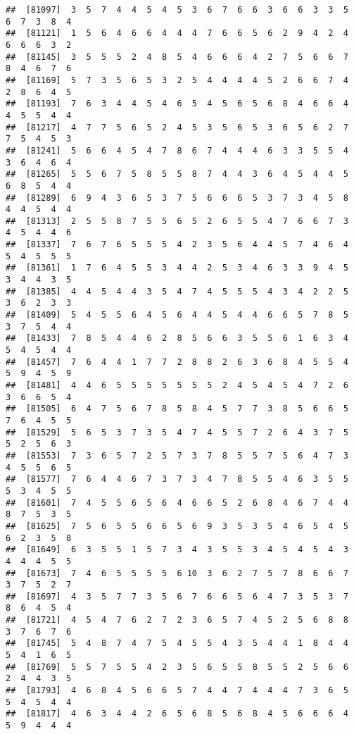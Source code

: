 \documentclass[
]{book}
\begin{document}
\begin{verbatim}
##  [81097]  3  5  7  4  4  5  4  5  3  6  7  6  6  3  6  6  3  3  5  6  7  3  8  4
##  [81121]  1  5  6  4  6  6  4  4  4  7  6  6  5  6  2  9  4  2  4  6  6  6  3  2
##  [81145]  3  5  5  5  2  4  8  5  4  6  6  6  4  2  7  5  6  6  7  8  4  6  7  6
##  [81169]  5  7  3  5  6  5  3  2  5  4  4  4  4  5  2  6  6  7  4  2  8  6  4  5
##  [81193]  7  6  3  4  4  5  4  6  5  4  5  6  5  6  8  4  6  6  4  4  5  5  4  4
##  [81217]  4  7  7  5  6  5  2  4  5  3  5  6  5  3  6  5  6  2  7  7  5  4  5  3
##  [81241]  5  6  6  4  5  4  7  8  6  7  4  4  4  6  3  3  5  5  4  3  6  4  6  4
##  [81265]  5  5  6  7  5  8  5  5  8  7  4  4  3  6  4  5  4  4  5  6  8  5  4  4
##  [81289]  6  9  4  3  6  5  3  7  5  6  6  6  5  3  7  3  4  5  8  4  4  5  4  4
##  [81313]  2  5  5  8  7  5  5  6  5  2  6  5  5  4  7  6  6  7  3  4  5  4  4  6
##  [81337]  7  6  7  6  5  5  5  4  2  3  5  6  4  4  5  7  4  6  4  5  4  5  5  5
##  [81361]  1  7  6  4  5  5  3  4  4  2  5  3  4  6  3  3  9  4  5  3  4  4  3  5
##  [81385]  4  4  5  4  4  3  5  4  7  4  5  5  5  4  3  4  2  2  5  3  6  2  3  3
##  [81409]  5  4  5  5  6  4  5  6  4  4  5  4  4  6  6  5  7  8  5  3  7  5  4  4
##  [81433]  7  8  5  4  4  6  2  8  5  6  6  3  5  5  6  1  6  3  4  5  4  5  4  4
##  [81457]  7  6  4  4  1  7  7  2  8  8  2  6  3  6  8  4  5  5  4  5  9  4  5  9
##  [81481]  4  4  6  5  5  5  5  5  5  5  2  4  5  4  5  4  7  2  6  3  6  6  5  4
##  [81505]  6  4  7  5  6  7  8  5  8  4  5  7  7  3  8  5  6  6  5  7  6  4  5  5
##  [81529]  5  6  5  3  7  3  5  4  7  4  5  5  7  2  6  4  3  7  5  5  2  5  6  3
##  [81553]  7  3  6  5  7  2  5  7  3  7  8  5  5  7  5  6  4  7  3  4  5  5  6  5
##  [81577]  7  6  4  4  6  7  3  7  3  4  7  8  5  5  4  6  3  5  5  5  3  4  5  5
##  [81601]  7  4  5  5  6  5  6  4  6  6  5  2  6  8  4  6  7  4  4  8  7  5  3  5
##  [81625]  7  5  6  5  5  6  6  5  6  9  3  5  3  5  4  6  5  4  5  6  2  3  5  8
##  [81649]  6  3  5  5  1  5  7  3  4  3  5  5  3  4  5  4  5  4  3  4  4  4  5  5
##  [81673]  7  4  6  5  5  5  5  6 10  3  6  2  7  5  7  8  6  6  7  3  7  5  2  7
##  [81697]  4  3  5  7  7  3  5  6  7  6  6  5  6  4  7  3  5  3  7  8  6  4  5  4
##  [81721]  4  5  4  7  6  2  7  2  3  6  5  7  4  5  2  5  6  8  8  3  7  6  7  6
##  [81745]  5  4  8  7  4  7  5  4  5  5  4  3  5  4  4  1  8  4  4  5  4  1  6  5
##  [81769]  5  5  7  5  5  4  2  3  5  6  5  5  8  5  5  2  5  6  6  2  4  4  3  5
##  [81793]  4  6  8  4  5  6  6  5  7  4  4  7  4  4  4  7  3  6  5  5  4  5  4  4
##  [81817]  4  6  3  4  4  2  6  5  6  8  5  6  8  4  5  6  6  6  4  5  9  4  4  4

\end{verbatim}
\end{document}
